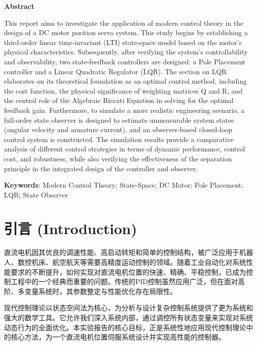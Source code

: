 \documentclass[12pt, a4paper]{article}
\begin{document}
\noindent
\begin{center} 
\noindent
\bfseries Abstract \end{center}

\noindent
This report aims to investigate the application of modern control theory in the design of a DC motor position servo system. This study begins by establishing a third-order linear time-invariant (LTI) state-space model based on the motor's physical characteristics. Subsequently, after verifying the system's controllability and observability, two state-feedback controllers are designed: a Pole Placement controller and a Linear Quadratic Regulator (LQR). The section on LQR elaborates on its theoretical foundation as an optimal control method, including the cost function, the physical significance of weighting matrices Q and R, and the central role of the Algebraic Riccati Equation in solving for the optimal feedback gain. Furthermore, to simulate a more realistic engineering scenario, a full-order state observer is designed to estimate unmeasurable system states (angular velocity and armature current), and an observer-based closed-loop control system is constructed. The simulation results provide a comparative analysis of different control strategies in terms of dynamic performance, control cost, and robustness, while also verifying the effectiveness of the separation principle in the integrated design of the controller and observer.
\vspace{1em}

\noindent
\textbf{Keywords}: Modern Control Theory; State-Space; DC Motor; Pole Placement; LQR; State Observer

\tableofcontents 
\newpage

\section{引言 (Introduction)}
直流电机因其优良的调速性能、高启动转矩和简单的控制结构，被广泛应用于机器人、数控机床、航空航天等需要高精度运动控制的领域。随着工业自动化对系统性能要求的不断提升，如何实现对直流电机位置的快速、精确、平稳控制，已成为控制工程中的一个经典而重要的问题。传统的PID控制虽然应用广泛，但在面对高阶、多变量系统时，其参数整定与性能优化存在局限性。

现代控制理论以状态空间法为核心，为分析与设计复杂控制系统提供了更为系统和强大的数学工具。它允许我们深入系统内部，通过调控所有状态变量来实现对系统动态行为的全面优化。本实验报告的核心目标，正是系统性地应用现代控制理论中的核心方法，为一个直流电机位置伺服系统设计并实现高性能的控制器。
\end{document}
